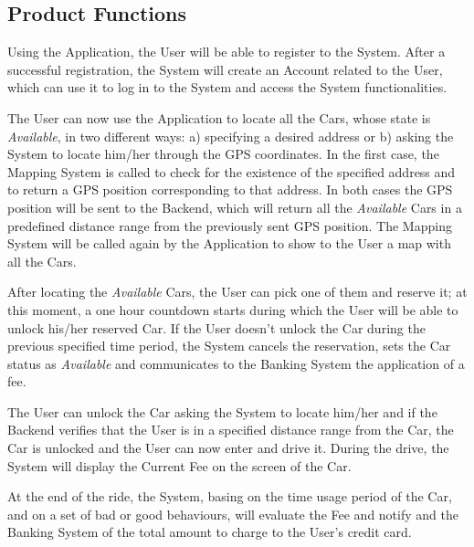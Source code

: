 \subsection{Product Functions}
Using the Application, the User will be able to register to the System. After a successful registration, the System will create an Account related to the User, which can use it to log in to the System and access the System functionalities.

The User can now use the Application to locate all the Cars, whose state is \textit{Available}, in two different ways: a) specifying a desired address or b) asking the System to locate him/her through the GPS coordinates. In the first case, the Mapping System is called to check for the existence of the specified address and to return a GPS position corresponding to that address. In both cases the GPS position will be sent to the Backend, which will return all the \textit{Available} Cars in a predefined distance range from the previously sent GPS position. The Mapping System will be called again by the Application to show to the User a map with all the Cars.

After locating the \textit{Available} Cars, the User can pick one of them and reserve it; at this moment, a one hour countdown starts during which the User will be able to unlock his/her reserved Car. If the User doesn't unlock the Car during the previous specified time period, the System cancels the reservation, sets the Car status as \textit{Available} and communicates to the Banking System the application of a fee.

The User can unlock the Car asking the System to locate him/her and if the Backend verifies that the User is in a specified distance range from the Car, the Car is unlocked and the User can now enter and drive it. During the drive, the System will display the Current Fee on the screen of the Car.

At the end of the ride, the System, basing on the time usage period of the Car, and on a set of bad or good behaviours, will evaluate the Fee and notify and the Banking System of the total amount to charge to the User's credit card.

